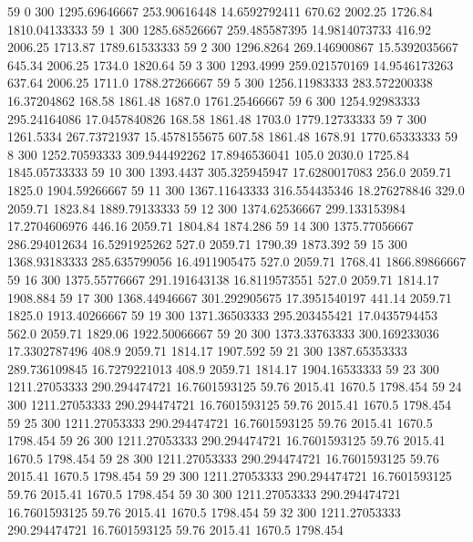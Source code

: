59  0  300  1295.69646667  253.90616448  14.6592792411  670.62  2002.25  1726.84  1810.04133333 
59  1  300  1285.68526667  259.485587395  14.9814073733  416.92  2006.25  1713.87  1789.61533333 
59  2  300  1296.8264  269.146900867  15.5392035667  645.34  2006.25  1734.0  1820.64 
59  3  300  1293.4999  259.021570169  14.9546173263  637.64  2006.25  1711.0  1788.27266667 
59  5  300  1256.11983333  283.572200338  16.37204862  168.58  1861.48  1687.0  1761.25466667 
59  6  300  1254.92983333  295.24164086  17.0457840826  168.58  1861.48  1703.0  1779.12733333 
59  7  300  1261.5334  267.73721937  15.4578155675  607.58  1861.48  1678.91  1770.65333333 
59  8  300  1252.70593333  309.944492262  17.8946536041  105.0  2030.0  1725.84  1845.05733333 
59  10  300  1393.4437  305.325945947  17.6280017083  256.0  2059.71  1825.0  1904.59266667 
59  11  300  1367.11643333  316.554435346  18.276278846  329.0  2059.71  1823.84  1889.79133333 
59  12  300  1374.62536667  299.133153984  17.2704606976  446.16  2059.71  1804.84  1874.286 
59  14  300  1375.77056667  286.294012634  16.5291925262  527.0  2059.71  1790.39  1873.392 
59  15  300  1368.93183333  285.635799056  16.4911905475  527.0  2059.71  1768.41  1866.89866667 
59  16  300  1375.55776667  291.191643138  16.8119573551  527.0  2059.71  1814.17  1908.884 
59  17  300  1368.44946667  301.292905675  17.3951540197  441.14  2059.71  1825.0  1913.40266667 
59  19  300  1371.36503333  295.203455421  17.0435794453  562.0  2059.71  1829.06  1922.50066667 
59  20  300  1373.33763333  300.169233036  17.3302787496  408.9  2059.71  1814.17  1907.592 
59  21  300  1387.65353333  289.736109845  16.7279221013  408.9  2059.71  1814.17  1904.16533333 
59  23  300  1211.27053333  290.294474721  16.7601593125  59.76  2015.41  1670.5  1798.454 
59  24  300  1211.27053333  290.294474721  16.7601593125  59.76  2015.41  1670.5  1798.454 
59  25  300  1211.27053333  290.294474721  16.7601593125  59.76  2015.41  1670.5  1798.454 
59  26  300  1211.27053333  290.294474721  16.7601593125  59.76  2015.41  1670.5  1798.454 
59  28  300  1211.27053333  290.294474721  16.7601593125  59.76  2015.41  1670.5  1798.454 
59  29  300  1211.27053333  290.294474721  16.7601593125  59.76  2015.41  1670.5  1798.454 
59  30  300  1211.27053333  290.294474721  16.7601593125  59.76  2015.41  1670.5  1798.454 
59  32  300  1211.27053333  290.294474721  16.7601593125  59.76  2015.41  1670.5  1798.454 


